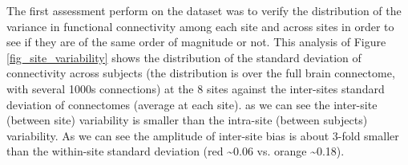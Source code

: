\documentclass[authoryear]{elsarticle}
\begin{document}


The first assessment perform on the dataset was to verify the distribution of the variance in functional connectivity among each site and across sites in order to see if they are of the same order of magnitude or not. This analysis of Figure \ref{fig_site_variability} shows the distribution of the standard deviation of connectivity across subjects (the distribution is over the full brain connectome, with several 1000s connections) at the 8 sites against the inter-sites standard deviation of connectomes (average at each site). as we can see the inter-site (between site) variability is smaller than the intra-site (between subjects) variability. As we can see the amplitude of inter-site bias is about 3-fold smaller than the within-site standard deviation (red \textasciitilde0.06 vs. orange \textasciitilde0.18).
\end{document}
